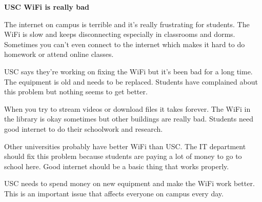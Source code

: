 \documentclass[12pt]{article}
\begin{document}
\newpage
\begin{originalversion}
\textbf{USC WiFi is really bad}

The internet on campus is terrible and it's really frustrating for students. The WiFi is slow and keeps disconnecting especially in classrooms and dorms. Sometimes you can't even connect to the internet which makes it hard to do homework or attend online classes.

USC says they're working on fixing the WiFi but it's been bad for a long time. The equipment is old and needs to be replaced. Students have complained about this problem but nothing seems to get better.

When you try to stream videos or download files it takes forever. The WiFi in the library is okay sometimes but other buildings are really bad. Students need good internet to do their schoolwork and research.

Other universities probably have better WiFi than USC. The IT department should fix this problem because students are paying a lot of money to go to school here. Good internet should be a basic thing that works properly.

USC needs to spend money on new equipment and make the WiFi work better. This is an important issue that affects everyone on campus every day.
\end{originalversion}
\newpage
\end{document}

